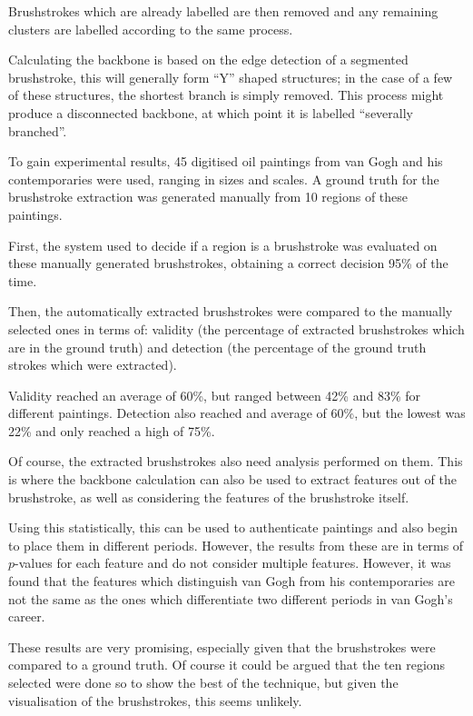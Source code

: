 \documentclass[conference]{IEEEtran}
\begin{document}
Brushstrokes which are already labelled are then removed and any remaining
clusters are labelled according to the same process.

Calculating the backbone is based on the edge detection of a segmented
brushstroke, this will generally form ``Y'' shaped structures; in the case of a
few of these structures, the shortest branch is simply removed. This process
might produce a disconnected backbone, at which point it is labelled
``severally branched''.

To gain experimental results, 45 digitised oil paintings from van Gogh and his
contemporaries were used, ranging in sizes and scales. A ground truth for the
brushstroke extraction was generated manually from 10 regions of these
paintings.

First, the system used to decide if a region is a brushstroke was evaluated on
these manually generated brushstrokes, obtaining a correct decision 95\% of the
time.

Then, the automatically extracted brushstrokes were compared to the manually
selected ones in terms of: validity (the percentage of extracted brushstrokes
which are in the ground truth) and detection (the percentage of the ground
truth strokes which were extracted).

Validity reached an average of 60\%, but ranged between 42\% and 83\% for
different paintings. Detection also reached and average of 60\%, but the lowest
was 22\% and only reached a high of 75\%.

Of course, the extracted brushstrokes also need analysis performed on them.
This is where the backbone calculation can also be used to extract features out
of the brushstroke, as well as considering the features of the brushstroke
itself.

Using this statistically, this can be used to authenticate paintings and also
begin to place them in different periods. However, the results from these are
in terms of $p$-values for each feature and do not consider multiple features.
However, it was found that the features which distinguish van Gogh from his
contemporaries are not the same as the ones which differentiate two different
periods in van Gogh's career.

These results are very promising, especially given that the brushstrokes were
compared to a ground truth. Of course it could be argued that the ten regions
selected were done so to show the best of the technique, but given the
visualisation of the brushstrokes, this seems unlikely.
\end{document}

